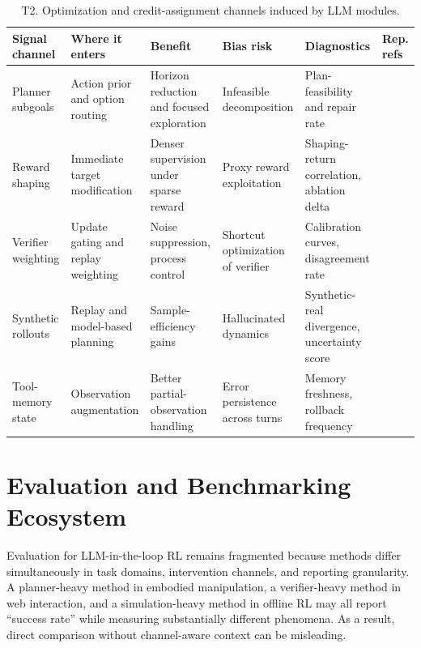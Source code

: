 \documentclass[pdflatex,sn-mathphys-num]{sn-jnl}
\begin{document}
\begin{table}[t]
\centering
\small
\setlength{\tabcolsep}{4pt}
\begin{tabularx}{\textwidth}{P{2.0cm}P{2.1cm}P{2.1cm}P{2.1cm}P{2.2cm}Y}
\toprule
\textbf{Signal channel} & \textbf{Where it enters} & \textbf{Benefit} & \textbf{Bias risk} & \textbf{Diagnostics} & \textbf{Rep. refs}\\
\midrule
Planner subgoals & Action prior and option routing & Horizon reduction and focused exploration & Infeasible decomposition & Plan-feasibility and repair rate & \cite{arxiv_p_2204_01691,arxiv_p_2602_16165}\\
Reward shaping & Immediate target modification & Denser supervision under sparse reward & Proxy reward exploitation & Shaping-return correlation, ablation delta & \cite{arxiv_p_2310_12931,arxiv_p_2309_11489}\\
Verifier weighting & Update gating and replay weighting & Noise suppression, process control & Shortcut optimization of verifier & Calibration curves, disagreement rate & \cite{arxiv_p_2602_06493,arxiv_p_2602_12579}\\
Synthetic rollouts & Replay and model-based planning & Sample-efficiency gains & Hallucinated dynamics & Synthetic-real divergence, uncertainty score & \cite{arxiv_p_2602_02454,arxiv_p_2602_11075}\\
Tool-memory state & Observation augmentation & Better partial-observation handling & Error persistence across turns & Memory freshness, rollback frequency & \cite{arxiv_p_2404_03648,arxiv_p_2602_00994}\\
\bottomrule
\end{tabularx}
\caption{T2. Optimization and credit-assignment channels induced by LLM modules.}
\label{tab:t2_optimization}
\end{table}

\section{Evaluation and Benchmarking Ecosystem}
Evaluation for LLM-in-the-loop RL remains fragmented because methods differ simultaneously in task domains, intervention channels, and reporting granularity. A planner-heavy method in embodied manipulation, a verifier-heavy method in web interaction, and a simulation-heavy method in offline RL may all report ``success rate'' while measuring substantially different phenomena. As a result, direct comparison without channel-aware context can be misleading.
\end{document}
